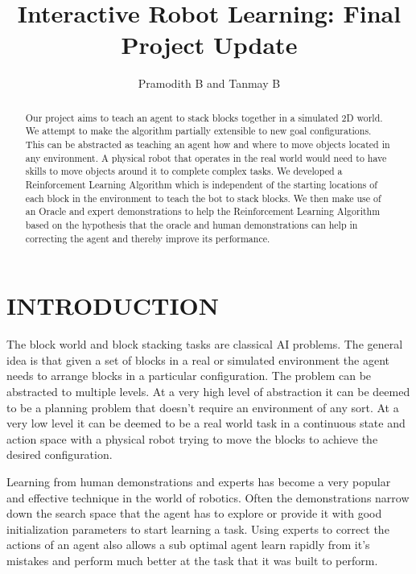 \documentclass[letterpaper, 12 pt, conference]{ieeeconf}
\title{\LARGE \bf
Interactive Robot Learning: Final Project Update 
}
\author{Pramodith B and Tanmay B}
\begin{document}
\maketitle
\thispagestyle{empty}
\pagestyle{empty}

\begin{abstract}

Our project aims to teach an agent to stack blocks together in a simulated 2D world. We attempt to make the algorithm partially extensible to new goal configurations. This can be abstracted as teaching an agent how and where to move objects located in any environment. A physical robot that operates in the real world would need to have skills to move objects around it to complete complex tasks. We developed a Reinforcement Learning Algorithm which is independent of the starting locations of each block in the environment to teach the bot to stack blocks. We then make use of an Oracle and expert demonstrations to help the Reinforcement Learning Algorithm based on the hypothesis that the oracle and human demonstrations can help in correcting the agent and thereby improve its performance. 

\end{abstract}


\section{INTRODUCTION}

The block world and block stacking tasks are classical AI problems. The general idea is that given a set of blocks in a real or simulated environment the agent needs to arrange blocks in a particular configuration. The problem can be abstracted to multiple levels. At a very high level of abstraction it can be deemed to be a planning problem that doesn’t require an environment of any sort. At a very low level it can be deemed to be a real world task in a continuous  state and action space with a physical robot trying to move the blocks to achieve the desired configuration.

Learning from human demonstrations and experts has become a very popular and effective technique in the world of robotics. Often the demonstrations narrow down the search space that the agent has to explore or provide it with good initialization parameters to start learning a task. Using experts to correct the actions of an agent also allows a sub optimal agent learn rapidly from it’s mistakes and perform much better at the task that it was built to perform.
\end{document}
